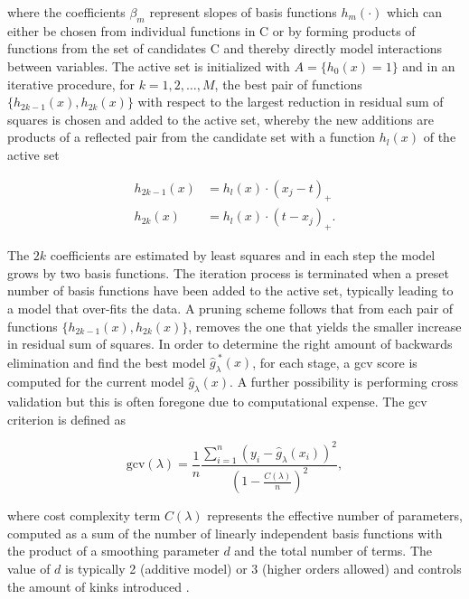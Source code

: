 where the coefficients $\beta_m$ represent slopes of basis functions $h_m(\cdot)$ which can either be chosen from individual functions in C or by forming products of functions from the set of candidates C and thereby directly model interactions between variables. The active set is initialized with $A=\{h_0(x)=1\}$ and in an iterative procedure, for $k=1, 2, \dotsc, M$, the best pair of functions $\{h_{2k-1}(x), h_{2k}(x)\}$ with respect to the largest reduction in residual sum of squares is chosen and added to the active set, whereby the new additions are products of a reflected pair from the candidate set with a function $h_l(x)$ of the active set

\begin{subequations}
\begin{align}
  h_{2k-1}(x) &= h_l(x) \cdot (x_j-t)_+ \\
  h_{2k}(x) &= h_l(x) \cdot (t-x_j)_+.
\end{align}
\end{subequations}

The $2k$ coefficients are estimated by least squares and in each step the model grows by two basis functions. The iteration process is terminated when a preset number of basis functions have been added to the active set, typically leading to a model that over-fits the data. A pruning scheme follows that from each pair of functions $\{h_{2k-1}(x), h_{2k}(x)\}$, removes the one that yields the smaller increase in residual sum of squares. In order to determine the right amount of backwards elimination and find the best model $\widehat{g}_\lambda^{\ *}(x)$, for each stage, a \gls{gcv} score is computed for the current model $\widehat{g}_\lambda(x)$. A further possibility is performing cross validation but this is often foregone due to computational expense. The \gls{gcv} criterion is defined as

\begin{equation}
  \text{gcv}(\lambda) = \frac{1}{n}\frac{\sum_{i=1}^n \left(y_i-\widehat{g}_\lambda(x_i)\right)^2}{\left(1-\frac{C(\lambda)}{n}\right)^2},
\end{equation}

where cost complexity term $C(\lambda)$ represents the effective number of parameters, computed as a sum of the number of linearly independent basis functions with the product of a smoothing parameter $d$ and the total number of terms. The value of $d$ is typically 2 (additive model) or 3 (higher orders allowed) and controls the amount of kinks introduced \citep{Friedman1991}.

